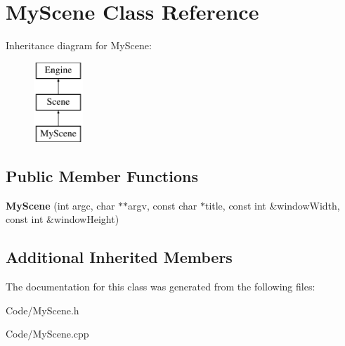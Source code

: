 \hypertarget{class_my_scene}{}\section{My\+Scene Class Reference}
\label{class_my_scene}
Inheritance diagram for My\+Scene\+:\begin{figure}[H]
\begin{center}
\leavevmode
\includegraphics[height=3.000000cm]{class_my_scene}
\end{center}
\end{figure}
\subsection*{Public Member Functions}
\begin{DoxyCompactItemize}
\item 
{\bfseries My\+Scene} (int argc, char $\ast$$\ast$argv, const char $\ast$title, const int \&window\+Width, const int \&window\+Height)\hypertarget{class_my_scene_ac1ab21722818b5d7102cf5174f0cc4c5}{}\label{class_my_scene_ac1ab21722818b5d7102cf5174f0cc4c5}

\end{DoxyCompactItemize}
\subsection*{Additional Inherited Members}


The documentation for this class was generated from the following files\+:\begin{DoxyCompactItemize}
\item 
Code/My\+Scene.\+h\item 
Code/My\+Scene.\+cpp\end{DoxyCompactItemize}
